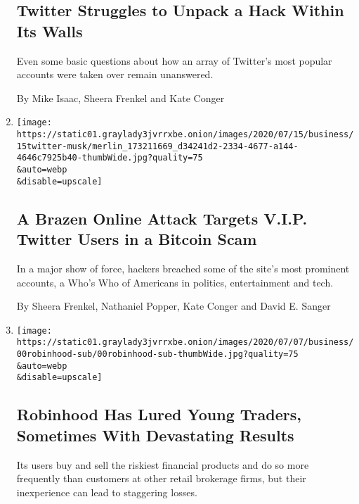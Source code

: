 \begin{enumerate}
  \hypertarget{twitter-struggles-to-unpack-a-hack-within-its-walls}{%
  \subsection{Twitter Struggles to Unpack a Hack Within Its
  Walls}\label{twitter-struggles-to-unpack-a-hack-within-its-walls}}

  Even some basic questions about how an array of Twitter's most popular
  accounts were taken over remain unanswered.

  By Mike Isaac, Sheera Frenkel and Kate Conger
\item
  \href{/2020/07/15/technology/twitter-hack-bill-gates-elon-musk.html}{}

  \texttt{[image: https://static01.graylady3jvrrxbe.onion/images/2020/07/15/business/15twitter-musk/merlin\_173211669\_d34241d2-2334-4677-a144-4646c7925b40-thumbWide.jpg?quality=75\\\&auto=webp\\\&disable=upscale]}

  \hypertarget{a-brazen-online-attack-targets-vip-twitter-users-in-a-bitcoin-scam}{%
  \subsection{A Brazen Online Attack Targets V.I.P. Twitter Users in a
  Bitcoin
  Scam}\label{a-brazen-online-attack-targets-vip-twitter-users-in-a-bitcoin-scam}}

  In a major show of force, hackers breached some of the site's most
  prominent accounts, a Who's Who of Americans in politics,
  entertainment and tech.

  By Sheera Frenkel, Nathaniel Popper, Kate Conger and David E. Sanger
\item
  \href{/2020/07/08/technology/robinhood-risky-trading.html}{}

  \texttt{[image: https://static01.graylady3jvrrxbe.onion/images/2020/07/07/business/00robinhood-sub/00robinhood-sub-thumbWide.jpg?quality=75\\\&auto=webp\\\&disable=upscale]}

  \hypertarget{robinhood-has-lured-young-traders-sometimes-with-devastating-results}{%
  \subsection{Robinhood Has Lured Young Traders, Sometimes With
  Devastating
  Results}\label{robinhood-has-lured-young-traders-sometimes-with-devastating-results}}

  Its users buy and sell the riskiest financial products and do so more
  frequently than customers at other retail brokerage firms, but their
  inexperience can lead to staggering losses.


\end{enumerate}
